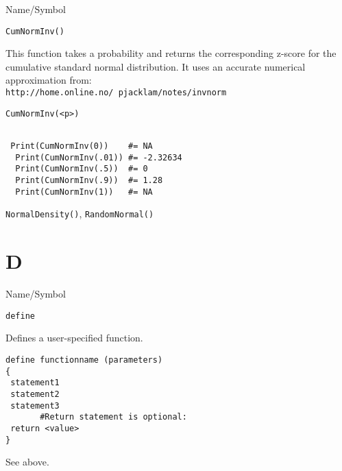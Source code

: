 \begin{desc}{Name/Symbol}
\item[Name/Symbol]  	\verb+CumNormInv()+

\item[Description] 	This function takes a probability and returns the 
  corresponding z-score for the cumulative standard normal distribution.
  It uses an accurate numerical approximation from:\\
  \texttt{http://home.online.no/~pjacklam/notes/invnorm}
\item[Usage]
\begin{verbatim}
CumNormInv(<p>)
\end{verbatim}

\item[Example]
\begin{verbatim}

 Print(CumNormInv(0))    #= NA
  Print(CumNormInv(.01)) #= -2.32634
  Print(CumNormInv(.5))  #= 0
  Print(CumNormInv(.9))  #= 1.28
  Print(CumNormInv(1))   #= NA
\end{verbatim}

\item[See Also] \verb+NormalDensity()+, \verb+RandomNormal()+
\end{desc}


\rl
\section{D}
\rl


\begin{desc}{Name/Symbol}
\item[Name/Symbol]  	\verb+define+

\item[Description]  	Defines a user-specified function.

\item[Usage]
\begin{verbatim}
define functionname (parameters)
{
 statement1
 statement2
 statement3
       #Return statement is optional:
 return <value>
}
\end{verbatim}

\item[Example]    	See above.

\item[See Also]
\end{desc}   	



